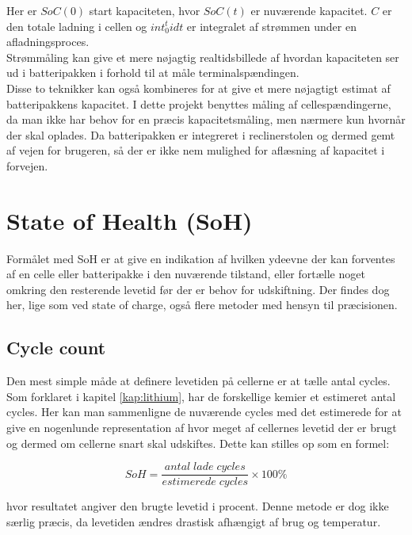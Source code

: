 Her er $SoC(0)$ start kapaciteten, hvor $SoC(t)$ er nuværende kapacitet. $C$ er den totale ladning i cellen og $int_{0}^{t} idt$ er integralet af strømmen under en afladningsproces.
\\

Strømmåling kan give et mere nøjagtig realtidsbillede af hvordan kapaciteten ser ud i batteripakken i forhold til at måle terminalspændingen.
\\

Disse to teknikker kan også kombineres for at give et mere nøjagtigt estimat af batteripakkens kapacitet. I dette projekt benyttes måling af cellespændingerne, da man ikke har behov for en præcis kapacitetsmåling, men nærmere kun hvornår der skal oplades. Da batteripakken er integreret i reclinerstolen og dermed gemt af vejen for brugeren, så der er ikke nem mulighed for aflæsning af kapacitet i forvejen. 

\section{State of Health (SoH)}
Formålet med SoH er at give en indikation af hvilken ydeevne der kan forventes af en celle eller batteripakke i den nuværende tilstand, eller fortælle noget omkring den resterende levetid før der er behov for udskiftning. Der findes dog her, lige som ved state of charge, også flere metoder med hensyn til præcisionen. 

\subsection{Cycle count}
Den mest simple måde at definere levetiden på cellerne er at tælle antal cycles. Som forklaret i kapitel \ref{kap:lithium}, har de forskellige kemier et estimeret antal cycles. Her kan man sammenligne de nuværende cycles med det estimerede for at give en nogenlunde representation af hvor meget af cellernes levetid der er brugt og dermed om cellerne snart skal udskiftes. Dette kan stilles op som en formel: 

\begin {equation} 
SoH = \frac{antal \; lade \; cycles}{estimerede \; cycles}\times 100\percent \label{eq:soh_cycles}
\end {equation}

hvor resultatet angiver den brugte levetid i procent. Denne metode er dog ikke særlig præcis, da levetiden ændres drastisk afhængigt af brug og temperatur. 

